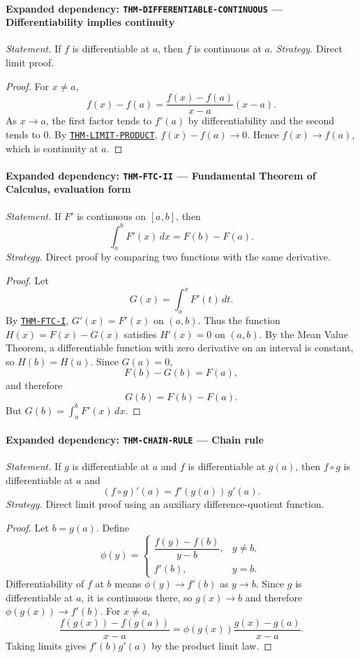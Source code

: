 \documentclass[10pt]{article}
\newcommand{\pidraw}[1]{\begingroup\urlstyle{tt}\nolinkurl{#1}\endgroup}
\newcommand{\pidref}[1]{\hyperref[prf:#1]{\pidraw{#1}}}
\newcommand{\pid}[1]{\pidref{#1}}
\theoremstyle{definition}
\theoremstyle{remark}
\begin{document}
\paragraph{Expanded dependency: \pidraw{THM-DIFFERENTIABLE-CONTINUOUS} --- Differentiability implies continuity}
\textit{Statement.} If $f$ is differentiable at $a$, then $f$ is continuous at $a$.
\textit{Strategy.} Direct limit proof.
\begin{proof}For $x\ne a$,
\[
f(x)-f(a)=
\frac{f(x)-f(a)}{x-a}(x-a).
\]
As $x\to a$, the first factor tends to $f'(a)$ by differentiability and the
second tends to $0$. By \pid{THM-LIMIT-PRODUCT},
$f(x)-f(a)\to0$. Hence $f(x)\to f(a)$, which is continuity at $a$.\end{proof}

\paragraph{Expanded dependency: \pidraw{THM-FTC-II} --- Fundamental Theorem of Calculus, evaluation form}
\textit{Statement.} If $F'$ is continuous on $[a,b]$, then
\[
\int_a^b F'(x)\,dx=F(b)-F(a).
\]
\textit{Strategy.} Direct proof by comparing two functions with the same derivative.
\begin{proof}Let
\[
G(x)=\int_a^x F'(t)\,dt.
\]
By \pid{THM-FTC-I}, $G'(x)=F'(x)$ on $(a,b)$. Thus the function
$H(x)=F(x)-G(x)$ satisfies $H'(x)=0$ on $(a,b)$. By the Mean Value Theorem,
a differentiable function with zero derivative on an interval is constant, so
$H(b)=H(a)$. Since $G(a)=0$,
\[
F(b)-G(b)=F(a),
\]
and therefore
\[
G(b)=F(b)-F(a).
\]
But $G(b)=\int_a^b F'(x)\,dx$.\end{proof}

\paragraph{Expanded dependency: \pidraw{THM-CHAIN-RULE} --- Chain rule}
\textit{Statement.} If $g$ is differentiable at $a$ and $f$ is differentiable at $g(a)$, then $f\circ g$ is differentiable at $a$ and
\[
(f\circ g)'(a)=f'(g(a))\,g'(a).
\]
\textit{Strategy.} Direct limit proof using an auxiliary difference-quotient function.
\begin{proof}Let $b=g(a)$. Define
\[
\phi(y)=
\begin{cases}
\dfrac{f(y)-f(b)}{y-b},&y\ne b,\\[4pt]
f'(b),&y=b.
\end{cases}
\]
Differentiability of $f$ at $b$ means $\phi(y)\to f'(b)$ as $y\to b$.
Since $g$ is differentiable at $a$, it is continuous there, so $g(x)\to b$ and
therefore $\phi(g(x))\to f'(b)$. For $x\ne a$,
\[
\frac{f(g(x))-f(g(a))}{x-a}
=
\phi(g(x))\frac{g(x)-g(a)}{x-a}.
\]
Taking limits gives $f'(b)g'(a)$ by the product limit law.\end{proof}
\end{document}
